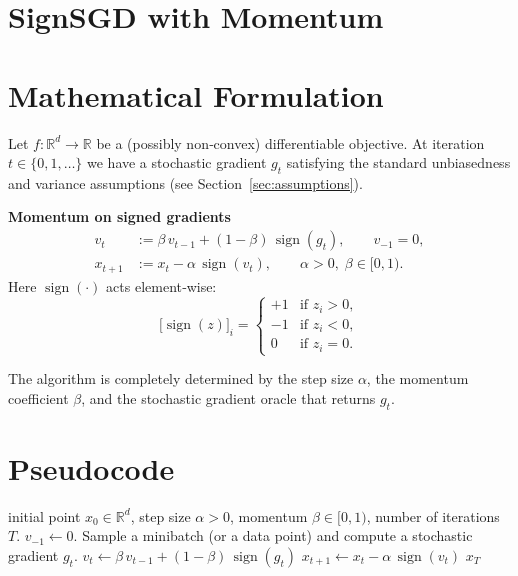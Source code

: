 \documentclass{article}
\begin{document}
\section*{SignSGD with Momentum}

\section*{Mathematical Formulation}
Let $f:\mathbb{R}^{d}\rightarrow\mathbb{R}$ be a (possibly non‑convex) differentiable objective.  
At iteration $t\in\{0,1,\dots\}$ we have a stochastic gradient $g_{t}$ satisfying the standard unbiasedness and variance assumptions (see Section~\ref{sec:assumptions}).  

\medskip
\noindent\textbf{Momentum on signed gradients}\\
\begin{align}
    v_{t} &:= \beta\,v_{t-1}+(1-\beta)\,\operatorname{sign}(g_{t}), \qquad v_{-1}=0, \label{eq:momentum}\\[4pt]
    x_{t+1}&:= x_{t}-\alpha\,\operatorname{sign}(v_{t}), \qquad  \alpha>0,\; \beta\in[0,1). \label{eq:update}
\end{align}
Here $\operatorname{sign}(\cdot)$ acts element‑wise:
\[
\bigl[\operatorname{sign}(z)\bigr]_{i}= 
\begin{cases}
+1 & \text{if }z_{i}>0,\\
-1 & \text{if }z_{i}<0,\\
0 & \text{if }z_{i}=0.
\end{cases}
\]

The algorithm is completely determined by the step size $\alpha$, the momentum coefficient $\beta$, and the stochastic gradient oracle that returns $g_{t}$.

\section*{Pseudocode}
\begin{algorithm}[H]
\caption{SignSGD with Momentum}
\label{alg:signsgd}
\begin{algorithmic}[1]
\REQUIRE initial point $x_{0}\in\mathbb{R}^{d}$, step size $\alpha>0$, momentum $\beta\in[0,1)$, number of iterations $T$.
\STATE $v_{-1}\gets 0$.
    \STATE Sample a minibatch (or a data point) and compute a stochastic gradient $g_{t}$.
    \STATE $v_{t}\gets \beta\,v_{t-1}+(1-\beta)\,\operatorname{sign}(g_{t})$ \hfill{}
    \STATE $x_{t+1}\gets x_{t}-\alpha\,\operatorname{sign}(v_{t})$ \hfill{}
\ENDFOR
\RETURN $x_{T}$
\end{algorithmic}
\end{algorithm}
\end{document}
